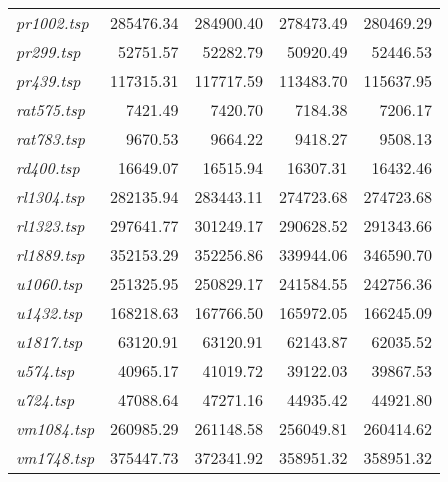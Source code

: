 {\begin{longtable}[H]{lrrrr}
\textit{pr1002.tsp} & 285476.34 & 284900.40 & 278473.49 & 280469.29\\
\textit{pr299.tsp} & 52751.57 & 52282.79 & 50920.49 & 52446.53\\
\textit{pr439.tsp} & 117315.31 & 117717.59 & 113483.70 & 115637.95\\
\textit{rat575.tsp} & 7421.49 & 7420.70 & 7184.38 & 7206.17\\
\textit{rat783.tsp} & 9670.53 & 9664.22 & 9418.27 & 9508.13\\
\textit{rd400.tsp} & 16649.07 & 16515.94 & 16307.31 & 16432.46\\
\textit{rl1304.tsp} & 282135.94 & 283443.11 & 274723.68 & 274723.68\\
\textit{rl1323.tsp} & 297641.77 & 301249.17 & 290628.52 & 291343.66\\
\textit{rl1889.tsp} & 352153.29 & 352256.86 & 339944.06 & 346590.70\\
\textit{u1060.tsp} & 251325.95 & 250829.17 & 241584.55 & 242756.36\\
\textit{u1432.tsp} & 168218.63 & 167766.50 & 165972.05 & 166245.09\\
\textit{u1817.tsp} & 63120.91 & 63120.91 & 62143.87 & 62035.52\\
\textit{u574.tsp} & 40965.17 & 41019.72 & 39122.03 & 39867.53\\
\textit{u724.tsp} & 47088.64 & 47271.16 & 44935.42 & 44921.80\\
\textit{vm1084.tsp} & 260985.29 & 261148.58 & 256049.81 & 260414.62\\
\textit{vm1748.tsp} & 375447.73 & 372341.92 & 358951.32 & 358951.32\\
\hline
\end{longtable}
}

